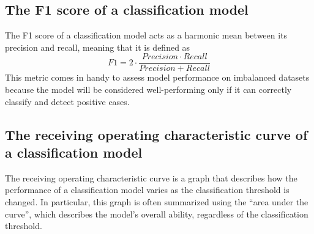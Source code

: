 \documentclass{report}
\begin{document}
\subsection{The F1 score of a classification model}
The F1 score of a classification model acts as a harmonic mean between its precision and recall, meaning that it is defined as
\[F1 = 2 \cdot \frac{Precision \cdot Recall}{Precision + Recall}\]
This metric comes in handy to assess model performance on imbalanced datasets because the model will be considered well-performing only if it can correctly classify and detect positive cases.
\subsection{The receiving operating characteristic curve of a classification model}
The receiving operating characteristic curve is a graph that describes how the performance of a classification model varies as the classification threshold is changed. \newline
In particular, this graph is often summarized using the ``area under the curve'', which describes the model's overall ability, regardless of the classification threshold.
\end{document}
